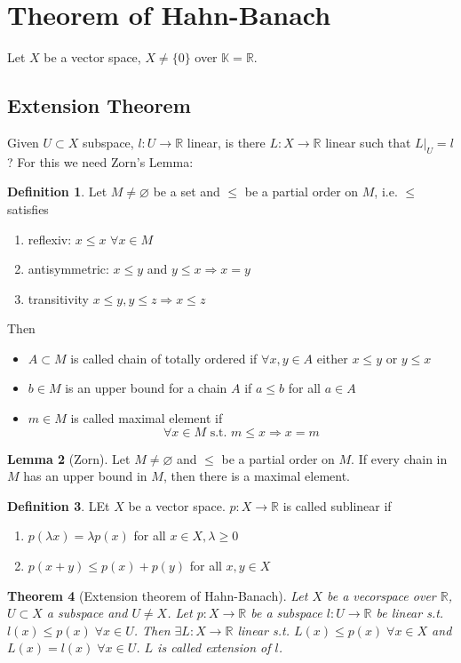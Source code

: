 \documentclass[a4paper, 12pt]{article}
\theoremstyle{plain}
\newtheorem{theorem}{Theorem}[subsection] %
\theoremstyle{definition}
\newtheorem{definition}[theorem]{Definition} %
\theoremstyle{lemma}
\newtheorem{lemma}[theorem]{Lemma}
\theoremstyle{remark}
\theoremstyle{corollary}
\theoremstyle{example}
\begin{document}
	\section{Theorem of Hahn-Banach}
	Let $X$ be a vector space, $X \neq \{0\}$ over $\mathbb{K} = \mathbb{R}$.
	\subsection{Extension Theorem}
	Given $U\subset X$ subspace, $l: U \to \mathbb{R}$ linear, is there $L: X \to \mathbb{R}$ linear such that $L|_U = l$? For this we need Zorn's Lemma:
	\begin{definition}
		Let $M\neq \varnothing$ be a set and $\leq$ be a partial order on $M$, i.e. $\leq$ satisfies
		\begin{enumerate}
			\item reflexiv: $x \leq x$ $\forall x \in M$
			\item antisymmetric: $x \leq y$ and $y \leq x \Rightarrow x = y$
			\item transitivity $x \leq y, y \leq z \Rightarrow x \leq z$
		\end{enumerate}
	Then
		\begin{itemize}
			\item $A \subset M$ is called chain of totally ordered if $\forall x,y \in A$ either $x \leq y$ or $y \leq x$
			\item $b \in M$ is an upper bound for a chain $A$ if $a \leq b$ for all $a \in A$
			\item $m \in M$ is called maximal element if \[\forall x \in M \text{ s.t. } m \leq x \Rightarrow x = m\]
		\end{itemize}
	\end{definition}
	\begin{lemma} [Zorn]
		Let $M\neq \varnothing$ and $\leq$ be a partial order on $M$. If every chain in $M$ has an upper bound in $M$, then there is a maximal element.
	\end{lemma}
	\begin{definition}
		LEt $X$ be a vector space. $p: X \to \mathbb{R}$ is called sublinear if \begin{enumerate}
			\item $p(\lambda x) = \lambda p(x)$ for all $x \in X, \lambda \geq 0$
			\item $p(x+y) \leq p(x)+p(y)$ for all $x,y \in X$
		\end{enumerate}
	\end{definition}
	\begin{theorem}[Extension theorem of Hahn-Banach]
		Let $X$ be a vecorspace over $\mathbb{R}$, $U\subset X$ a subspace and $U\neq X$. Let $p:X \to \mathbb{R}$ be a subspace $l: U \to \mathbb{R}$ be linear s.t. $l(x) \leq p(x) \; \forall x \in U$. Then $\exists L:X \to \mathbb{R}$ linear s.t. $L(x) \leq p(x) \; \forall x \in X$ and $L(x) = l(x) \; \forall x \in U$. $L$ is called extension of $l$.
	\end{theorem}
\end{document}
